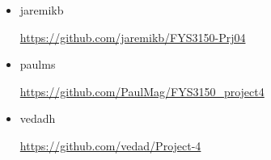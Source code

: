 \begin{itemize}
    \item jaremikb

        \url{https://github.com/jaremikb/FYS3150-Prj04}
        
    \item paulms

        \url{https://github.com/PaulMag/FYS3150_project4}
        
    \item vedadh

        \url{https://github.com/vedad/Project-4}
\end{itemize}
